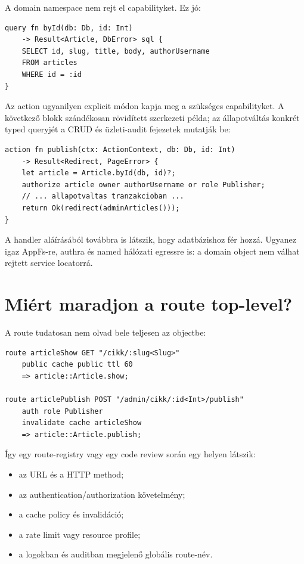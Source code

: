 A domain namespace nem rejt el capabilityket. Ez jó:

\begin{lstlisting}[language=RWLang]
query fn byId(db: Db, id: Int)
    -> Result<Article, DbError> sql {
    SELECT id, slug, title, body, authorUsername
    FROM articles
    WHERE id = :id
}
\end{lstlisting}

Az action ugyanilyen explicit módon kapja meg a szükséges capabilityket. A következő blokk szándékosan rövidített szerkezeti példa; az állapotváltás konkrét typed queryjét a CRUD és üzleti-audit fejezetek mutatják be:

\begin{lstlisting}
action fn publish(ctx: ActionContext, db: Db, id: Int)
    -> Result<Redirect, PageError> {
    let article = Article.byId(db, id)?;
    authorize article owner authorUsername or role Publisher;
    // ... allapotvaltas tranzakcioban ...
    return Ok(redirect(adminArticles()));
}
\end{lstlisting}

A handler aláírásából továbbra is látszik, hogy adatbázishoz fér hozzá. Ugyanez igaz AppFs-re, authra és named hálózati egressre is: a domain object nem válhat rejtett service locatorrá.

\section{Miért maradjon a route top-level?}

A route tudatosan nem olvad bele teljesen az objectbe:

\begin{lstlisting}[language=RWLang]
route articleShow GET "/cikk/:slug<Slug>"
    public cache public ttl 60
    => article::Article.show;

route articlePublish POST "/admin/cikk/:id<Int>/publish"
    auth role Publisher
    invalidate cache articleShow
    => article::Article.publish;
\end{lstlisting}

Így egy route-registry vagy egy code review során egy helyen látszik:

\begin{itemize}
  \item az URL és a HTTP method;
  \item az authentication/authorization követelmény;
  \item a cache policy és invalidáció;
  \item a rate limit vagy resource profile;
  \item a logokban és auditban megjelenő globális route-név.
\end{itemize}

